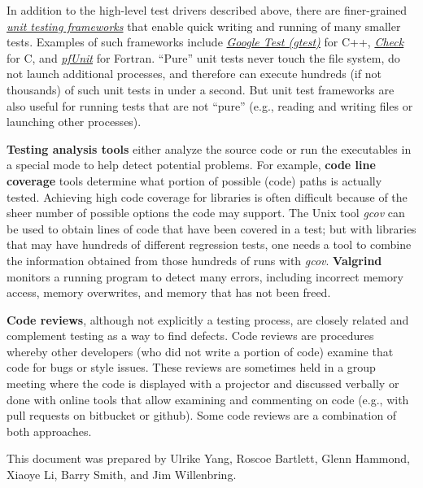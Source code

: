 \documentclass[]{article}
\begin{document}
In addition to the high-level test drivers described above, there are
finer-grained
\href{https://en.wikipedia.org/wiki/Unit_testing\#Unit_testing_frameworks}{\emph{unit
testing frameworks}} that enable quick writing and running of many
smaller tests. Examples of such frameworks include
\href{https://en.wikipedia.org/wiki/Google_Test}{\emph{Google Test
(gtest)}} for C++, \href{http://check.sourceforge.net/}{\emph{Check}}
for C, and \href{https://en.wikipedia.org/wiki/PFUnit}{\emph{pfUnit}}
for Fortran. ``Pure'' unit tests never touch the file system, do not
launch additional processes, and therefore can execute hundreds (if not
thousands) of such unit tests in under a second. But unit test
frameworks are also useful for running tests that are not ``pure''
(e.g., reading and writing files or launching other processes).

\textbf{Testing analysis tools} either analyze the source code or run
the executables in a special mode to help detect potential problems. For
example, \textbf{code line coverage} tools determine what portion of
possible (code) paths is actually tested. Achieving high code coverage
for libraries is often difficult because of the sheer number of possible
options the code may support. The Unix tool \emph{gcov} can be used to
obtain lines of code that have been covered in a test; but with
libraries that may have hundreds of different regression tests, one
needs a tool to combine the information obtained from those hundreds of
runs with \emph{gcov}. \textbf{Valgrind} monitors a running program to
detect many errors, including incorrect memory access, memory
overwrites, and memory that has not been freed.

\textbf{Code reviews}, although not explicitly a testing process, are
closely related and complement testing as a way to find defects. Code
reviews are procedures whereby other developers (who did not write a
portion of code) examine that code for bugs or style issues. These
reviews are sometimes held in a group meeting where the code is
displayed with a projector and discussed verbally or done with online
tools that allow examining and commenting on code (e.g., with pull
requests on bitbucket or github). Some code reviews are a combination of
both approaches.

This document was prepared by Ulrike Yang, Roscoe Bartlett, Glenn
Hammond, Xiaoye Li, Barry Smith, and Jim Willenbring.
\end{document}
